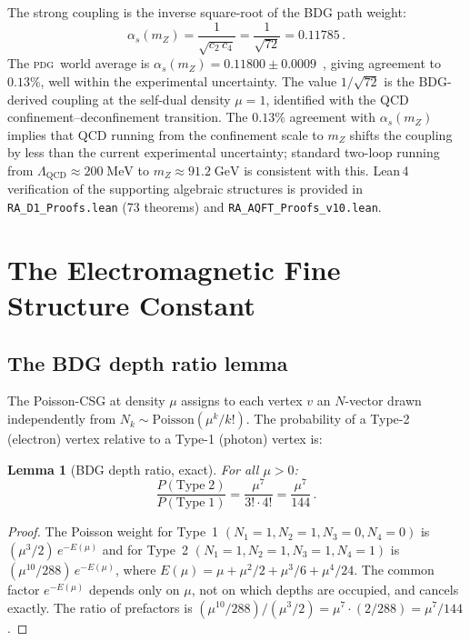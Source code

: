 \documentclass[11pt,twocolumn]{article}
\newtheorem{lemma}{Lemma}[section]
\newcommand{\alphas}{\alpha_s}
\newcommand{\PDG}{\textsc{pdg}}
\begin{document}
The strong coupling is the inverse square-root of the BDG path weight:
\begin{equation}
  \boxed{\alphas(m_Z) = \frac{1}{\sqrt{c_2\,c_4}} = \frac{1}{\sqrt{72}}
    = 0.11785\,.}
  \label{eq:alphas}
\end{equation}
The \PDG\ world average is $\alphas(m_Z) = 0.11800 \pm 0.0009$~\cite{PDG2024},
giving agreement to $0.13\%$, well within the experimental uncertainty.
The value $1/\!\sqrt{72}$ is the BDG-derived coupling at the self-dual density
$\mu=1$, identified with the QCD confinement--deconfinement transition.
The $0.13\%$ agreement with $\alphas(m_Z)$ implies that QCD running from the
confinement scale to $m_Z$ shifts the coupling by less than the current
experimental uncertainty; standard two-loop running from
$\Lambda_{\mathrm{QCD}} \approx 200\;\mathrm{MeV}$ to
$m_Z \approx 91.2\;\mathrm{GeV}$ is consistent with this.
Lean\,4 verification of the supporting algebraic structures is provided
in \texttt{RA\_D1\_Proofs.lean} (73 theorems) and
\texttt{RA\_AQFT\_Proofs\_v10.lean}.

\section{The Electromagnetic Fine Structure Constant}

\subsection{The BDG depth ratio lemma}

The Poisson-CSG at density $\mu$ assigns to each vertex $v$ an
$N$-vector drawn independently from $N_k\sim\mathrm{Poisson}(\mu^k/k!)$.
The probability of a Type-2 (electron) vertex relative to a Type-1
(photon) vertex is:

\begin{lemma}[BDG depth ratio, exact]
\label{lem:ratio}
For all $\mu > 0$:
\begin{equation}
  \frac{P(\mathrm{Type\;2})}{P(\mathrm{Type\;1})}
  = \frac{\mu^7}{3!\cdot 4!} = \frac{\mu^7}{144}\,.
  \label{eq:depth_ratio}
\end{equation}
\end{lemma}

\begin{proof}
The Poisson weight for Type~1 $(N_1{=}1, N_2{=}1, N_3{=}0, N_4{=}0)$ is
$(\mu^3/2)\,e^{-E(\mu)}$ and for Type~2 $(N_1{=}1, N_2{=}1, N_3{=}1, N_4{=}1)$
is $(\mu^{10}/288)\,e^{-E(\mu)}$, where
$E(\mu) = \mu + \mu^2/2 + \mu^3/6 + \mu^4/24$.
The common factor $e^{-E(\mu)}$ depends only on $\mu$, not on which
depths are occupied, and cancels exactly.
The ratio of prefactors is $(\mu^{10}/288)/(\mu^3/2)
= \mu^7 \cdot (2/288) = \mu^7/144$.
\end{proof}
\end{document}

